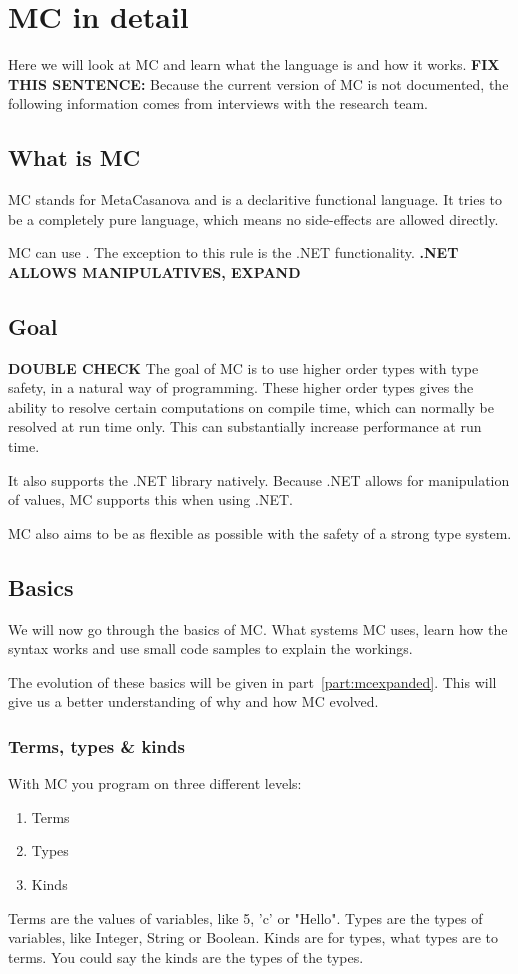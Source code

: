 \chapter{MC in detail}
Here we will look at MC and learn what the language is and how it works.
\textbf{FIX THIS SENTENCE:}
Because the current version of MC is not documented, the following information comes from interviews with the research team.

\section{What is MC}
MC stands for MetaCasanova and is a declaritive functional language.
It tries to be a completely pure language, which means no side-effects are allowed directly.

MC can use .
The exception to this rule is the .NET functionality.
\textbf{.NET ALLOWS MANIPULATIVES, EXPAND}


\section{Goal}
\textbf{DOUBLE CHECK}
The goal of MC is to use higher order types with type safety, in a natural way of programming.
These higher order types gives the ability to resolve certain computations on compile time, which can normally be resolved at run time only.
This can substantially increase performance at run time.

It also supports the .NET library natively.
Because .NET allows for manipulation of values, MC supports this when using .NET.

MC also aims to be as flexible as possible with the safety of a strong type system.


\section{Basics}
We will now go through the basics of MC.
What systems MC uses, learn how the syntax works and use small code samples to explain the workings.

The evolution of these basics will be given in part~\ref{part:mcexpanded}.
This will give us a better understanding of why and how MC evolved.


\subsection{Terms, types \& kinds}\label{sec:basiclevels}
With MC you program on three different levels:
\begin{enumerate}[noitemsep]
   \item Terms
   \item Types
   \item Kinds
\end{enumerate}
Terms are the values of variables, like 5, 'c' or "Hello".
Types are the types of variables, like Integer, String or Boolean.
Kinds are for types, what types are to terms.
You could say the kinds are the types of the types.

